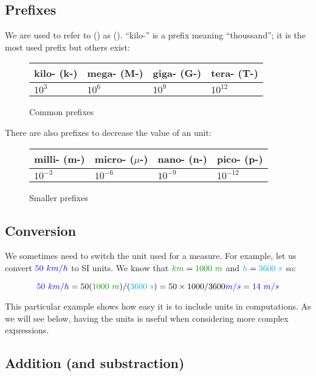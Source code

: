 \subsection{Prefixes}

We are used to refer to  () as  (). “kilo-” is a prefix meaning “thoussand”;
it is the most used prefix but others exist:

\begin{figure}[H]
\centering
\begin{tabular}{l|l|l|l}
kilo- (k-) & mega- (M-) & giga- (G-) & tera- (T-) \\
\hline
$10^3$     & $10^6$     & $10^9$     & $10^{12}$  \\
\end{tabular}
\caption{Common prefixes}
\end{figure}

\begin{remark}
There are also prefixes to decrease the value of an unit:

\begin{figure}[H]
\centering
\begin{tabular}{l|l|l|l}
milli- (m-) & micro- ($\mu$-) & nano- (n-) & pico- (p-) \\
\hline
$10^{-3}$   & $10^{-6}$       & $10^{-9}$  & $10^{-12}$ \\
\end{tabular}
\caption{Smaller prefixes}
\end{figure}
\end{remark}


\subsection{Conversion}

We sometimes need to switch the unit used for a measure. For example,
let us convert $\textcolor{blue}{50~km/h}$ to SI units. We know that $\dist{km}
= \dist{1000~m}$ and $\textcolor{cyan}{h} = \textcolor{cyan}{3600~s}$ so:

\[
\speed{50~km/h}
= 50 (\dist{1000~m})/(\delay{3600~s})
= 50 \times 1000 / 3600 \speed{m/s}
= \speed{14~m/s}
\]

This particular example shows how easy it is to include units in
computations. As we will see below, having the units is useful when
considering more complex expressions.


\subsection{Addition (and substraction)}

